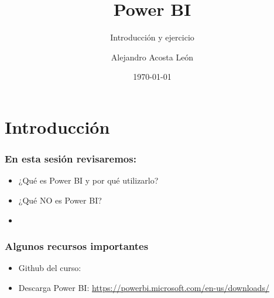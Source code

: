 \documentclass{beamer}
\title{Power BI}
\subtitle{Introducción y ejercicio}
\author{Alejandro Acosta León}
\date{\today}
\begin{document}
\maketitle

\section{Introducción}
\begin{frame}
	\frametitle{En esta sesión revisaremos:}
		\begin{itemize}
			\item ¿Qué es Power BI y por qué utilizarlo?
			\item ¿Qué NO es Power BI?
			\item 
		\end{itemize}
\end{frame}

\begin{frame}
	\frametitle{Algunos recursos importantes}
		\begin{itemize}
			\item Github del curso: \url{}
			\item Descarga Power BI: \url{https://powerbi.microsoft.com/en-us/downloads/}
		\end{itemize}
\end{frame}
\end{document}
